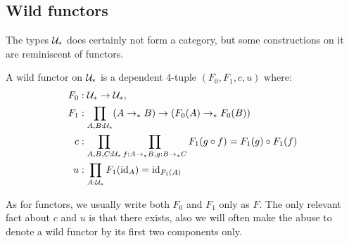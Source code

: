 \documentclass[english,a4]{article}
\newcommand{\ptdto}{\to_\ast}%
\newcommand{\UUptd}{\UU_{\ast}}
\begin{document}
\subsection{Wild functors}
\label{sec:wild-functors}
The types $\UUptd$ does certainly not form a category, but some
constructions on it are reminiscent of functors. 
\begin{definition}
  A wild functor on $\UUptd$ is a dependent $4$-tuple $(F_0,F_1,c,u)$ where:
  \begin{align*}
    F_0 &:\UUptd \to \UUptd,\\
    F_1 &:\prod_{A,B:\UUptd} (A \ptdto B) \to (F_0(A) \ptdto F_0(B))\\
    c &: \prod_{A,B,C:\UUptd}\prod_{f:A\ptdto B, g:B\ptdto C}F_1(g\circ f) = F_1(g) \circ F_1(f)\\
    u &: \prod_{A:\UUptd} F_1(\id_A) = \id_{F_1(A)}
  \end{align*}
  \label{def:wild-functor}
\end{definition}

As for functors, we usually write both $F_0$ and $ F_1$ only as $F$. The only
relevant fact about $c$ and $u$ is that there exists, also we will often make
the abuse to denote a wild functor by its first two components only.
\end{document}
